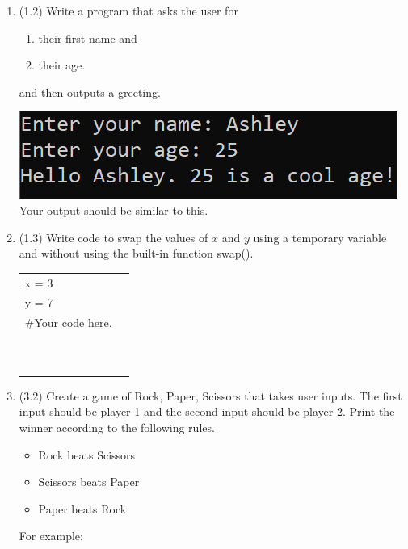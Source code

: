 \documentclass{article}
\begin{document}
\begin{enumerate}
\item (1.2) Write a program that asks the user for \\
		\begin{minipage}{0.5\textwidth}
		\vspace*{-0.5em}
			\begin{enumerate}  \setlength\itemsep{-0.3em}
				\item their first name and
				\item their age.  
			\end{enumerate} \vspace*{-1ex}
		and then outputs a greeting.
		\end{minipage}
		\begin{minipage}{0.5\textwidth}
			\centering
			\includegraphics[scale=0.95]{./imgs/outputGreetingWithAge.png}\\
			Your output should be similar to this.
		\end{minipage}




\item (1.3) 
		Write code to swap the values of $x$ and $y$ using a temporary variable and without using
		the built-in function swap().\\		
		\begin{tabular}{|ll}
			\\			
			x = 3\\
			y = 7\\[5pt]
			\#Your code here. \\[5pt]
			& \\ & \\ & \\ & \\ & \\ & \\ & \\ & \\ & \\ & \\ 
		\end{tabular}



\item (3.2)  
		Create a game of Rock, Paper, Scissors that takes user inputs.  
		The first input should be player 1 and the second 
		input should be player 2.  Print the winner according to the following rules. 
		\begin{itemize}
			\item Rock beats Scissors
			\item Scissors beats Paper
			\item Paper beats Rock
		\end{itemize}		
		For example:


\end{enumerate}
\end{document}
